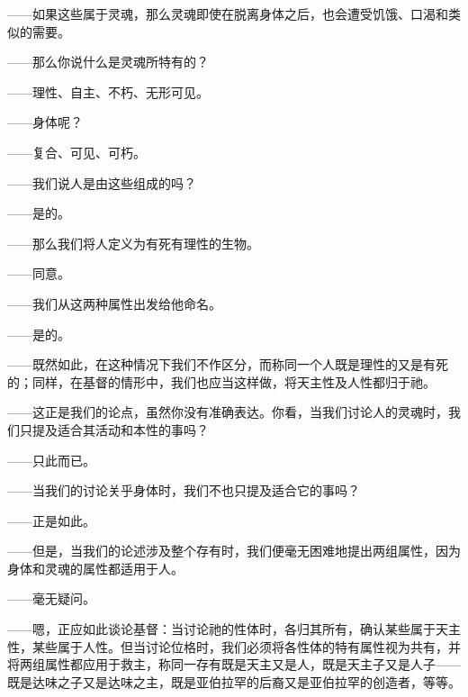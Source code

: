 ——如果这些属于灵魂，那么灵魂即使在脱离身体之后，也会遭受饥饿、口渴和类似的需要。\par

——那么你说什么是灵魂所特有的？\par

——理性、自主、不朽、无形可见。\par

——身体呢？\par

——复合、可见、可朽。\par

——我们说人是由这些组成的吗？\par

——是的。\par

——那么我们将人定义为有死有理性的生物。\par

——同意。\par

——我们从这两种属性出发给他命名。\par

——是的。\par

——既然如此，在这种情况下我们不作区分，而称同一个人既是理性的又是有死的；同样，在基督的情形中，我们也应当这样做，将天主性及人性都归于祂。\par

——这正是我们的论点，虽然你没有准确表达。你看，当我们讨论人的灵魂时，我们只提及适合其活动和本性的事吗？\par

——只此而已。\par

——当我们的讨论关乎身体时，我们不也只提及适合它的事吗？\par

——正是如此。\par

——但是，当我们的论述涉及整个存有时，我们便毫无困难地提出两组属性，因为身体和灵魂的属性都适用于人。\par

——毫无疑问。\par

——嗯，正应如此谈论基督：当讨论祂的性体时，各归其所有，确认某些属于天主性，某些属于人性。但当讨论位格时，我们必须将各性体的特有属性视为共有，并将两组属性都应用于救主，称同一存有既是天主又是人，既是天主子又是人子——既是达味之子又是达味之主，既是亚伯拉罕的后裔又是亚伯拉罕的创造者，等等。\par

